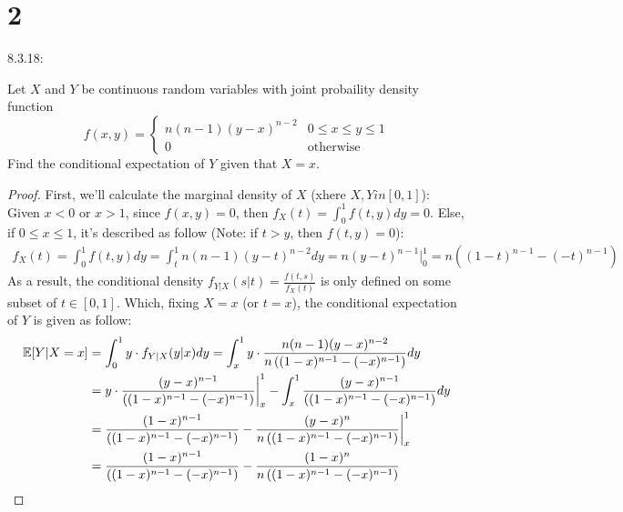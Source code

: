 \documentclass{article}
\begin{document}
\newpage

\section*{2}
\begin{ques}\label{q2}
    8.3.18:

    Let $X$ and $Y$ be continuous random variables with joint probaility density function 
    $$f(x,y) = \begin{cases}
        n(n-1)(y-x)^{n-2} & 0\leq x\leq y\leq 1\\
        0 &\text{otherwise}
    \end{cases}$$
    Find the conditional expectation of $Y$ given that $X=x$.
\end{ques}

\begin{proof}
    First, we'll calculate the marginal density of $X$ (xhere $X,Y in [0,1]$): Given $x<0$ or $x>1$, since $f(x,y)=0$, then $f_X(t) = \int_{0}^{1}f(t,y) dy =0$. Else, if $0\leq x\leq 1$, it's described as follow (Note: if $t>y$, then $f(t,y)=0$):
    \begin{align}
        f_X(t) = \int_{0}^{1}f(t,y) dy = \int_{t}^{1}n(n-1)(y-t)^{n-2}dy = n(y-t)^{n-1}\bigg|_{0}^{1} = n\left((1-t)^{n-1}-(-t)^{n-1}\right)
    \end{align}
    As a result, the conditional density $f_{Y|X}(s|t) = \frac{f(t,s)}{f_X(t)}$ is only defined on some subset of $t\in [0,1]$. Which, fixing $X=x$ (or $t=x$), the conditional expectation of $Y$ is given as follow:
    \begin{align}
        \mathbb{E}[Y|X=x] &= \int_{0}^{1}y\cdot f_{Y|X}(y|x)dy  = \int_{x}^{1}y\cdot\frac{n(n-1)(y-x)^{n-2}}{n\left((1-x)^{n-1}-(-x)^{n-1}\right)}dy\\
        &= y\cdot \frac{(y-x)^{n-1}}{\left((1-x)^{n-1}-(-x)^{n-1}\right)}\bigg|_{x}^{1} - \int_{x}^{1}\frac{(y-x)^{n-1}}{\left((1-x)^{n-1}-(-x)^{n-1}\right)}dy \\
        &= \frac{(1-x)^{n-1}}{\left((1-x)^{n-1}-(-x)^{n-1}\right)} - \frac{(y-x)^n}{n\left((1-x)^{n-1}-(-x)^{n-1}\right)}\bigg|_{x}^{1}\\
        &= \frac{(1-x)^{n-1}}{\left((1-x)^{n-1}-(-x)^{n-1}\right)} - \frac{(1-x)^n}{n\left((1-x)^{n-1}-(-x)^{n-1}\right)}
    \end{align}
\end{proof}

\newpage
\end{document}
